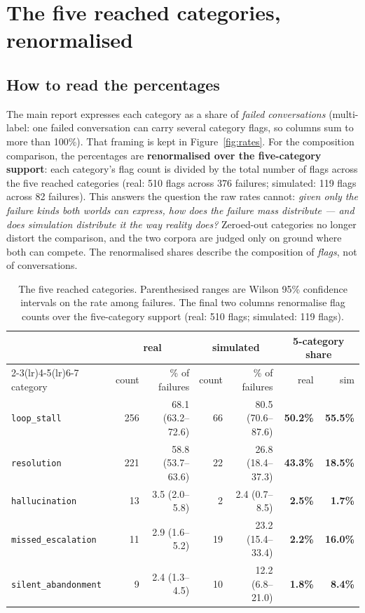 \documentclass[11pt,a4paper]{article}
\newcommand{\cat}[1]{\texttt{#1}}
\begin{document}
\section{The five reached categories, renormalised}

\subsection{How to read the percentages}

The main report expresses each category as a share of \emph{failed conversations} (multi-label:
one failed conversation can carry several category flags, so columns sum to more than 100\%). That
framing is kept in Figure~\ref{fig:rates}. For the composition comparison, the percentages are
\textbf{renormalised over the five-category support}: each category's flag count is divided by the
total number of flags across the five reached categories (real: 510 flags across 376 failures;
simulated: 119 flags across 82 failures). This answers the question the raw rates cannot:
\emph{given only the failure kinds both worlds can express, how does the failure mass distribute
--- and does simulation distribute it the way reality does?} Zeroed-out categories no longer
distort the comparison, and the two corpora are judged only on ground where both can compete. The
renormalised shares describe the composition of \emph{flags}, not of conversations.

\begin{table}[H]
\centering
\small
\begin{tabular}{lrrrrrr}
\toprule
 & \multicolumn{2}{c}{real} & \multicolumn{2}{c}{simulated} & \multicolumn{2}{c}{5-category share} \\
\cmidrule(lr){2-3}\cmidrule(lr){4-5}\cmidrule(lr){6-7}
category & count & \% of failures & count & \% of failures & real & sim \\
\midrule
\cat{loop\_stall}          & 256 & 68.1 {\scriptsize(63.2--72.6)} & 66 & 80.5 {\scriptsize(70.6--87.6)} & \textbf{50.2\%} & \textbf{55.5\%} \\
\cat{resolution}           & 221 & 58.8 {\scriptsize(53.7--63.6)} & 22 & 26.8 {\scriptsize(18.4--37.3)} & \textbf{43.3\%} & \textbf{18.5\%} \\
\cat{hallucination}        &  13 &  3.5 {\scriptsize(2.0--5.8)}   &  2 &  2.4 {\scriptsize(0.7--8.5)}   & \textbf{2.5\%}  & \textbf{1.7\%}  \\
\cat{missed\_escalation}   &  11 &  2.9 {\scriptsize(1.6--5.2)}   & 19 & 23.2 {\scriptsize(15.4--33.4)} & \textbf{2.2\%}  & \textbf{16.0\%} \\
\cat{silent\_abandonment}  &   9 &  2.4 {\scriptsize(1.3--4.5)}   & 10 & 12.2 {\scriptsize(6.8--21.0)}  & \textbf{1.8\%}  & \textbf{8.4\%}  \\
\bottomrule
\end{tabular}
\caption{The five reached categories. Parenthesised ranges are Wilson 95\% confidence intervals on
the rate among failures. The final two columns renormalise flag counts over the five-category
support (real: 510 flags; simulated: 119 flags).}
\label{tab:five}
\end{table}
\end{document}
